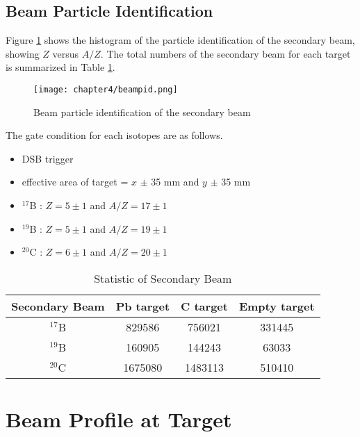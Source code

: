 \subsection{Beam Particle Identification}
Figure \ref{fig:Beam_PID} shows the histogram of the particle identification of the secondary beam, showing $Z$ versus $A/Z$. The total numbers of the secondary beam for each target is summarized in Table \ref{tab:Beam_PID}.

\begin{figure}[t]
    \centering
    \texttt{[image: chapter4/beampid.png]}
    \caption[Secondary beam particle identification]{Beam particle identification of the secondary beam}
    \label{fig:Beam_PID}
\end{figure}

The gate condition for each isotopes are as follows.
\begin{itemize}
    \item DSB trigger 
    \item effective area of target = $x$ $\pm$ 35 mm and $y$ $\pm$ 35 mm
    \item ${}^{17}$B : $Z = 5 \pm 1$ and $A/Z = 17 \pm 1$
    \item ${}^{19}$B : $Z = 5 \pm 1$ and $A/Z = 19 \pm 1$
    \item ${}^{20}$C : $Z = 6 \pm 1$ and $A/Z = 20 \pm 1$
\end{itemize}


\begin{table}[h]
    \centering
    \begin{tabular}{cccc}
        \hline
        Secondary Beam & Pb target & C target & Empty target\\             
        \hline
        ${}^{17}$B & 829586 & 756021 & 331445 \\
        ${}^{19}$B &  160905&  144243&  63033\\
        ${}^{20}$C &  1675080 & 1483113 & 510410 \\
        \hline
    \end{tabular}
    \caption{Statistic of Secondary Beam}
    \label{tab:Beam_PID}
\end{table}


\section{Beam Profile at Target}

